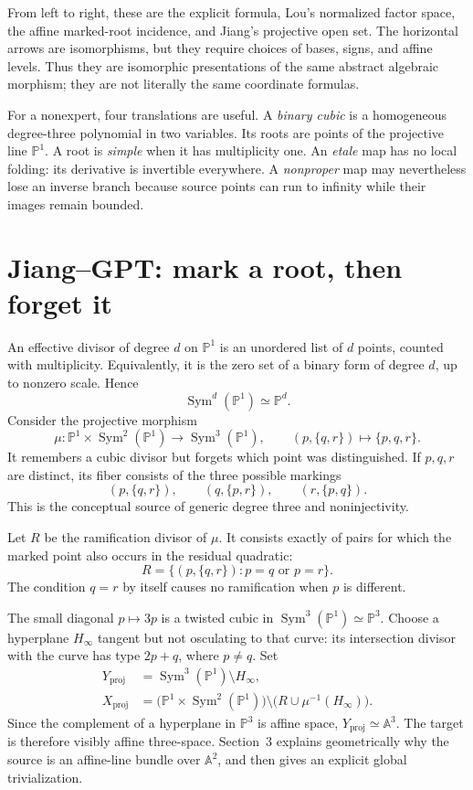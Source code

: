 \documentclass[11pt,a4paper]{article}
\theoremstyle{remark}
\DeclareMathOperator{\Sym}{Sym}
\newcommand{\A}{\mathbb A}
\newcommand{\PP}{\mathbb P}
\begin{document}
From left to right, these are the explicit formula, Lou's normalized factor
space, the affine marked-root incidence, and Jiang's projective open set.
The horizontal arrows are isomorphisms, but they require choices of bases,
signs, and affine levels.  Thus they are isomorphic presentations of the same
abstract algebraic morphism; they are not literally the same coordinate
formulas.

For a nonexpert, four translations are useful.  A \emph{binary cubic} is a
homogeneous degree-three polynomial in two variables.  Its roots are points
of the projective line $\PP^1$.  A root is \emph{simple} when it has
multiplicity one.  An \emph{etale} map has no local folding: its derivative is
invertible everywhere.  A \emph{nonproper} map may nevertheless lose an
inverse branch because source points can run to infinity while their images
remain bounded.

\section{Jiang--GPT: mark a root, then forget it}

An effective divisor of degree $d$ on $\PP^1$ is an unordered list of $d$
points, counted with multiplicity.  Equivalently, it is the zero set of a
binary form of degree $d$, up to nonzero scale.  Hence
\[
  \Sym^d(\PP^1)\simeq\PP^d.
\]
Consider the projective morphism
\[
\mu\colon\PP^1\times\Sym^2(\PP^1)\longrightarrow\Sym^3(\PP^1),
\qquad (p,\{q,r\})\longmapsto\{p,q,r\}.
\tag{2.1}
\]
It remembers a cubic divisor but forgets which point was distinguished.  If
$p,q,r$ are distinct, its fiber consists of the three possible markings
\[
  (p,\{q,r\}),\qquad(q,\{p,r\}),\qquad(r,\{p,q\}).
\]
This is the conceptual source of generic degree three and noninjectivity.

Let $R$ be the ramification divisor of $\mu$.  It consists exactly of pairs
for which the marked point also occurs in the residual quadratic:
\[
  R=\{(p,\{q,r\}):p=q\text{ or }p=r\}.
\tag{2.2}
\]
The condition $q=r$ by itself causes no ramification when $p$ is different.

The small diagonal $p\mapsto3p$ is a twisted cubic in
$\Sym^3(\PP^1)\simeq\PP^3$.  Choose a hyperplane $H_\infty$ tangent but not
osculating to that curve: its intersection divisor with the curve has type
$2p+q$, where $p\ne q$.  Set
\begin{align*}
Y_{\mathrm{proj}}&=\Sym^3(\PP^1)\setminus H_\infty,\\
X_{\mathrm{proj}}&=
\bigl(\PP^1\times\Sym^2(\PP^1)\bigr)
\setminus\bigl(R\cup\mu^{-1}(H_\infty)\bigr).
\end{align*}
Since the complement of a hyperplane in $\PP^3$ is affine space,
$Y_{\mathrm{proj}}\simeq\A^3$.  The target is therefore visibly affine
three-space.  Section~3 explains geometrically why the source is an
affine-line bundle over $\A^2$, and then gives an explicit global
trivialization.
\end{document}
